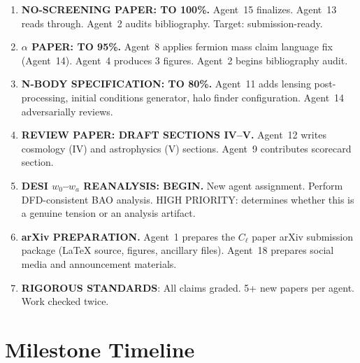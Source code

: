 \documentclass[11pt,a4paper]{article}
\begin{document}
\begin{enumerate}
\item \textbf{NO-SCREENING PAPER: TO 100\%.} Agent~15 finalizes. Agent~13 reads through. Agent~2 audits bibliography. Target: submission-ready.

\item \textbf{$\alpha$ PAPER: TO 95\%.} Agent~8 applies fermion mass claim language fix (Agent~14). Agent~4 produces 3 figures. Agent~2 begins bibliography audit.

\item \textbf{N-BODY SPECIFICATION: TO 80\%.} Agent~11 adds lensing post-processing, initial conditions generator, halo finder configuration. Agent~14 adversarially reviews.

\item \textbf{REVIEW PAPER: DRAFT SECTIONS IV--V.} Agent~12 writes cosmology (IV) and astrophysics (V) sections. Agent~9 contributes scorecard section.

\item \textbf{DESI $w_0$--$w_a$ REANALYSIS: BEGIN.} New agent assignment. Perform DFD-consistent BAO analysis. HIGH PRIORITY: determines whether this is a genuine tension or an analysis artifact.

\item \textbf{arXiv PREPARATION.} Agent~1 prepares the $C_\ell$ paper arXiv submission package (LaTeX source, figures, ancillary files). Agent~18 prepares social media and announcement materials.

\item \textbf{RIGOROUS STANDARDS}: All claims graded. 5+ new papers per agent. Work checked twice.
\end{enumerate}


\section{Milestone Timeline}
\label{sec:timeline}
\end{document}

